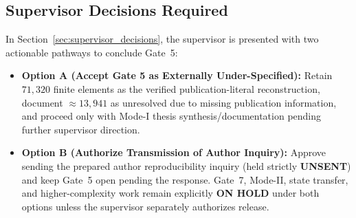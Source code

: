 \subsection{Supervisor Decisions Required}
In Section~\ref{sec:supervisor_decisions}, the supervisor is presented with two actionable pathways to conclude Gate~5:
\begin{itemize}[leftmargin=4mm,itemsep=0pt,topsep=1pt]
  \item \textbf{Option A (Accept Gate 5 as Externally Under-Specified):} Retain $71{,}320$ finite elements as the verified publication-literal reconstruction, document $\approx 13{,}941$ as unresolved due to missing publication information, and proceed only with Mode-I thesis synthesis/documentation pending further supervisor direction.
  \item \textbf{Option B (Authorize Transmission of Author Inquiry):} Approve sending the prepared author reproducibility inquiry (held strictly \textbf{UNSENT}) and keep Gate~5 open pending the response. Gate~7, Mode-II, state transfer, and higher-complexity work remain explicitly \textbf{ON HOLD} under both options unless the supervisor separately authorizes release.
\end{itemize}
